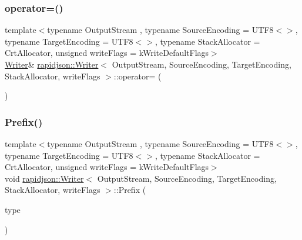 \subsubsection{\texorpdfstring{operator=()}{operator=()}}
{\footnotesize\ttfamily template$<$typename Output\+Stream , typename Source\+Encoding  = U\+T\+F8$<$$>$, typename Target\+Encoding  = U\+T\+F8$<$$>$, typename Stack\+Allocator  = Crt\+Allocator, unsigned write\+Flags = k\+Write\+Default\+Flags$>$ \\
\mbox{\hyperlink{classrapidjson_1_1_writer}{Writer}}\& \mbox{\hyperlink{classrapidjson_1_1_writer}{rapidjson\+::\+Writer}}$<$ Output\+Stream, Source\+Encoding, Target\+Encoding, Stack\+Allocator, write\+Flags $>$\+::operator= (\begin{DoxyParamCaption}\item[{const \mbox{\hyperlink{classrapidjson_1_1_writer}{Writer}}$<$ Output\+Stream, Source\+Encoding, Target\+Encoding, Stack\+Allocator, write\+Flags $>$ \&}]{ }\end{DoxyParamCaption})\hspace{0.3cm}{\ttfamily [private]}}

\mbox{\label{classrapidjson_1_1_writer_aefe33eab3521b2d9366dff3b788f0665}} 
\subsubsection{\texorpdfstring{Prefix()}{Prefix()}}
{\footnotesize\ttfamily template$<$typename Output\+Stream , typename Source\+Encoding  = U\+T\+F8$<$$>$, typename Target\+Encoding  = U\+T\+F8$<$$>$, typename Stack\+Allocator  = Crt\+Allocator, unsigned write\+Flags = k\+Write\+Default\+Flags$>$ \\
void \mbox{\hyperlink{classrapidjson_1_1_writer}{rapidjson\+::\+Writer}}$<$ Output\+Stream, Source\+Encoding, Target\+Encoding, Stack\+Allocator, write\+Flags $>$\+::Prefix (\begin{DoxyParamCaption}\item[{\mbox{\hyperlink{namespacerapidjson_ae79a4751c1c460ff0de5ecc07874f3e4}{Type}}}]{type }\end{DoxyParamCaption})\hspace{0.3cm}{\ttfamily [protected]}}




